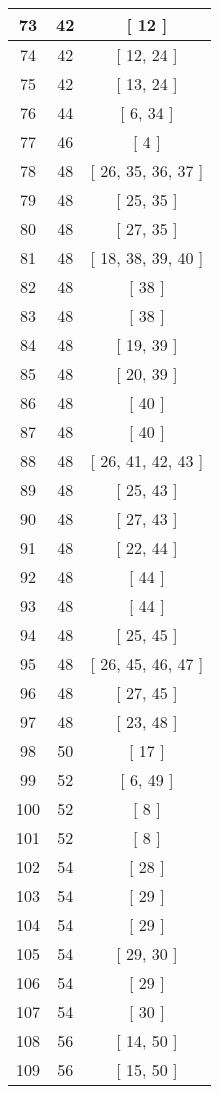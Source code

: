 \begin{center}
\begin{longtable}[H]{|| c c c ||}
\hline
73 & 42 & [ 12 ] \\ 
\hline
74 & 42 & [ 12, 24 ] \\ 
\hline
75 & 42 & [ 13, 24 ] \\ 
\hline
76 & 44 & [ 6, 34 ] \\ 
\hline
77 & 46 & [ 4 ] \\ 
\hline
78 & 48 & [ 26, 35, 36, 37 ] \\ 
\hline
79 & 48 & [ 25, 35 ] \\ 
\hline
80 & 48 & [ 27, 35 ] \\ 
\hline
81 & 48 & [ 18, 38, 39, 40 ] \\ 
\hline
82 & 48 & [ 38 ] \\ 
\hline
83 & 48 & [ 38 ] \\ 
\hline
84 & 48 & [ 19, 39 ] \\ 
\hline
85 & 48 & [ 20, 39 ] \\ 
\hline
86 & 48 & [ 40 ] \\ 
\hline
87 & 48 & [ 40 ] \\ 
\hline
88 & 48 & [ 26, 41, 42, 43 ] \\ 
\hline
89 & 48 & [ 25, 43 ] \\ 
\hline
90 & 48 & [ 27, 43 ] \\ 
\hline
91 & 48 & [ 22, 44 ] \\ 
\hline
92 & 48 & [ 44 ] \\ 
\hline
93 & 48 & [ 44 ] \\ 
\hline
94 & 48 & [ 25, 45 ] \\ 
\hline
95 & 48 & [ 26, 45, 46, 47 ] \\ 
\hline
96 & 48 & [ 27, 45 ] \\ 
\hline
97 & 48 & [ 23, 48 ] \\ 
\hline
98 & 50 & [ 17 ] \\ 
\hline
99 & 52 & [ 6, 49 ] \\ 
\hline
100 & 52 & [ 8 ] \\ 
\hline
101 & 52 & [ 8 ] \\ 
\hline
102 & 54 & [ 28 ] \\ 
\hline
103 & 54 & [ 29 ] \\ 
\hline
104 & 54 & [ 29 ] \\ 
\hline
105 & 54 & [ 29, 30 ] \\ 
\hline
106 & 54 & [ 29 ] \\ 
\hline
107 & 54 & [ 30 ] \\ 
\hline
108 & 56 & [ 14, 50 ] \\ 
\hline
109 & 56 & [ 15, 50 ] \\ 

\end{longtable}
\end{center}
